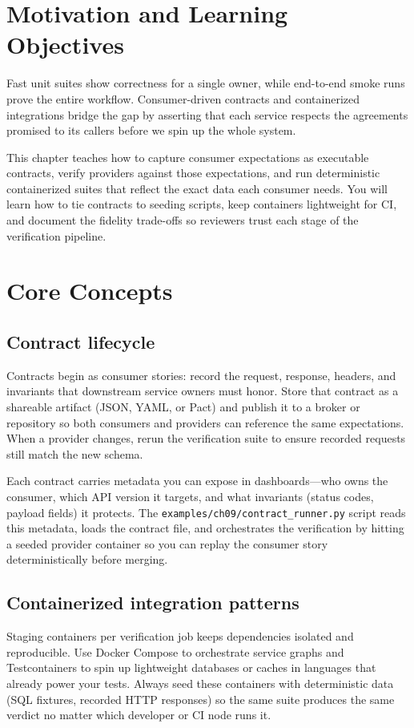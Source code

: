 \section{Motivation and Learning Objectives}
Fast unit suites show correctness for a single owner, while end-to-end smoke runs prove the entire workflow. Consumer-driven contracts and containerized integrations bridge the gap by asserting that each service respects the agreements promised to its callers before we spin up the whole system.

This chapter teaches how to capture consumer expectations as executable contracts, verify providers against those expectations, and run deterministic containerized suites that reflect the exact data each consumer needs. You will learn how to tie contracts to seeding scripts, keep containers lightweight for CI, and document the fidelity trade-offs so reviewers trust each stage of the verification pipeline.

\section{Core Concepts}
\subsection{Contract lifecycle}
Contracts begin as consumer stories: record the request, response, headers, and invariants that downstream service owners must honor. Store that contract as a shareable artifact (JSON, YAML, or Pact) and publish it to a broker or repository so both consumers and providers can reference the same expectations. When a provider changes, rerun the verification suite to ensure recorded requests still match the new schema.

Each contract carries metadata you can expose in dashboards—who owns the consumer, which API version it targets, and what invariants (status codes, payload fields) it protects. The \texttt{examples/ch09/contract\_runner.py} script reads this metadata, loads the contract file, and orchestrates the verification by hitting a seeded provider container so you can replay the consumer story deterministically before merging.

\subsection{Containerized integration patterns}
Staging containers per verification job keeps dependencies isolated and reproducible. Use Docker Compose to orchestrate service graphs and Testcontainers to spin up lightweight databases or caches in languages that already power your tests. Always seed these containers with deterministic data (SQL fixtures, recorded HTTP responses) so the same suite produces the same verdict no matter which developer or CI node runs it.

